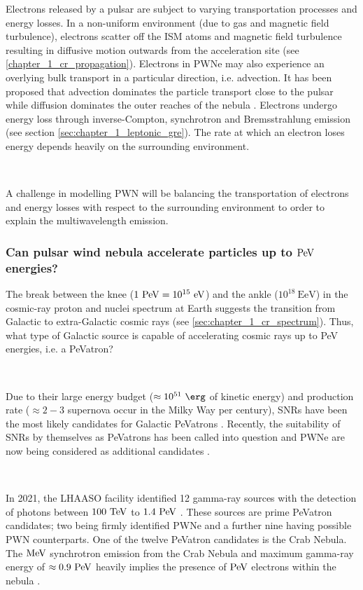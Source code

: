Electrons released by a pulsar are subject to varying transportation processes and energy losses. In a non-uniform environment (due to gas and magnetic field turbulence), electrons scatter off the ISM atoms and magnetic field turbulence resulting in diffusive motion outwards from the acceleration site (see \autoref{chapter_1_cr_propagation}). Electrons in PWNe may also experience an overlying bulk transport in a particular direction, i.e. advection. It has been proposed that advection dominates the particle transport close to the pulsar while diffusion dominates the outer reaches of the nebula \citep{2020A&A...636A.113G, 2021PhRvD.104l3017R}. Electrons undergo energy loss through inverse-Compton, synchrotron and Bremsstrahlung emission (see section \autoref{sec:chapter_1_leptonic_gre}). The rate at which an electron loses energy depends heavily on the surrounding environment.
\par~\par
A challenge in modelling PWN will be balancing the transportation of electrons and energy losses with respect to the surrounding environment to order to explain the multiwavelength emission.

\subsubsection{Can pulsar wind nebula accelerate particles up to $\PeV$ energies?}

The break between the knee ($1~\PeV=10^{15}~\eV$) and the ankle ($10^{18}~\si{\exa\electronvolt}$) in the cosmic-ray proton and nuclei spectrum at Earth suggests the transition from Galactic to extra-Galactic cosmic rays (see \autoref{sec:chapter_1_cr_spectrum}). Thus, what type of Galactic source is capable of accelerating cosmic rays up to PeV energies, i.e. a PeVatron?
\par~\par
Due to their large energy budget ($\approx 10^{51}~\ergs$ of kinetic energy) and production rate ($\approx 2-3$ supernova occur in the Milky Way per century), SNRs have been the most likely candidates for Galactic PeVatrons \citep{1983A&A...125..249L, 1984ARA&A..22..425H,2004MNRAS.353..550B,10.1093/mnras/sty1589}. Recently, the suitability of SNRs by themselves as PeVatrons has been called into question \citep{CRISTOFARI2020102492} and PWNe are now being considered as additional candidates \citep{2018MNRAS.478..926O, Xin_2019, de_O_a_Wilhelmi_2022,2022A&A...660A...8B}.
\par~\par
In 2021, the LHAASO facility identified 12 gamma-ray sources with the detection of photons between $100~\TeV$ to $1.4~\PeV$ \citep{2021Natur.594...33C}. These sources are prime PeVatron candidates; two being firmly identified PWNe and a further nine having possible PWN counterparts. One of the twelve PeVatron candidates is the Crab Nebula. The $\si{\mega\electronvolt}$ synchrotron emission from the Crab Nebula and maximum gamma-ray energy of $\approx 0.9~\PeV$ heavily implies the presence of $\PeV$ electrons within the nebula \citep{doi:10.1126/science.abg5137}.

